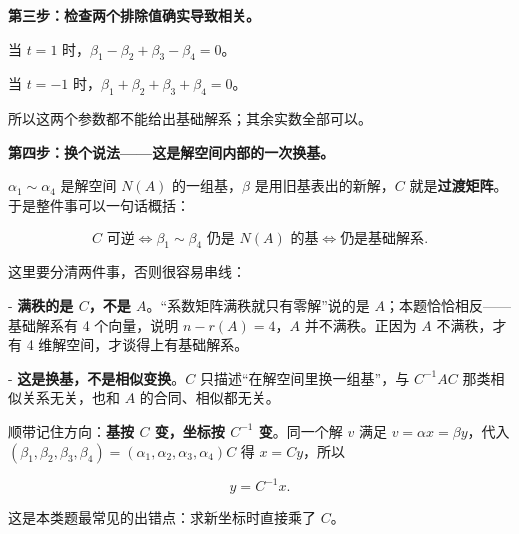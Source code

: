 \documentclass[UTF8,11pt,fontset=windows]{ctexart}
\begin{document}
\textbf{第三步：检查两个排除值确实导致相关。}

当 $t=1$ 时，$\beta_1-\beta_2+\beta_3-\beta_4=0$。

当 $t=-1$ 时，$\beta_1+\beta_2+\beta_3+\beta_4=0$。

所以这两个参数都不能给出基础解系；其余实数全部可以。

\textbf{第四步：换个说法——这是解空间内部的一次换基。}

$\alpha_1\sim\alpha_4$ 是解空间 $N(A)$ 的一组基，$\beta$ 是用旧基表出的新解，$C$ 就是\textbf{过渡矩阵}。于是整件事可以一句话概括：

$$
C\text{ 可逆}\iff\beta_1\sim\beta_4\text{ 仍是 }N(A)\text{ 的基}\iff\text{仍是基础解系}.
$$

这里要分清两件事，否则很容易串线：

- \textbf{满秩的是 $C$，不是 $A$}。“系数矩阵满秩就只有零解”说的是 $A$；本题恰恰相反——基础解系有 4 个向量，说明 $n-r(A)=4$，$A$ 并不满秩。正因为 $A$ 不满秩，才有 4 维解空间，才谈得上有基础解系。

- \textbf{这是换基，不是相似变换}。$C$ 只描述“在解空间里换一组基”，与 $C^{-1}AC$ 那类相似关系无关，也和 $A$ 的合同、相似都无关。

顺带记住方向：\textbf{基按 $C$ 变，坐标按 $C^{-1}$ 变}。同一个解 $v$ 满足 $v=\alpha x=\beta y$，代入 $(\beta_1,\beta_2,\beta_3,\beta_4)=(\alpha_1,\alpha_2,\alpha_3,\alpha_4)C$ 得 $x=Cy$，所以

$$
y=C^{-1}x.
$$

这是本类题最常见的出错点：求新坐标时直接乘了 $C$。
\end{document}
